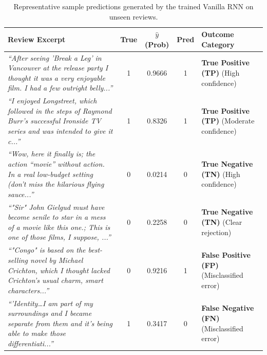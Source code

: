 \documentclass[11pt,a4paper]{article}
\begin{document}
\begin{table}[H]
\centering
\small
\begin{tabular}{p{7.2cm}cccp{2.6cm}}
\toprule
\textbf{Review Excerpt} & \textbf{True} & \textbf{$\hat{y}$ (Prob)} & \textbf{Pred} & \textbf{Outcome Category} \\
\midrule
\textit{``After seeing 'Break a Leg' in Vancouver at the release party I thought it was a very enjoyable film. I had a few outright belly...''} & 1 & 0.9666 & 1 & \textbf{True Positive (TP)} (High confidence) \\
\midrule
\textit{``I enjoyed Longstreet, which followed in the steps of Raymond Burr's successful Ironside TV series and was intended to give it c...''} & 1 & 0.8326 & 1 & \textbf{True Positive (TP)} (Moderate confidence) \\
\midrule
\textit{``Wow, here it finally is; the action ``movie'' without action. In a real low-budget setting (don't miss the hilarious flying sauce...''} & 0 & 0.0214 & 0 & \textbf{True Negative (TN)} (High confidence) \\
\midrule
\textit{``"Sir" John Gielgud must have become senile to star in a mess of a movie like this one.; This is one of those films, I suppose, ...''} & 0 & 0.2258 & 0 & \textbf{True Negative (TN)} (Clear rejection) \\
\midrule
\textit{``"Congo" is based on the best-selling novel by Michael Crichton, which I thought lacked Crichton's usual charm, smart characters...''} & 0 & 0.9216 & 1 & \textbf{False Positive (FP)} (Misclassified error) \\
\midrule
\textit{``'Identity\dots I am part of my surroundings and I became separate from them and it's being able to make those differentiati...''} & 1 & 0.3417 & 0 & \textbf{False Negative (FN)} (Misclassified error) \\
\bottomrule
\end{tabular}
\caption{Representative sample predictions generated by the trained Vanilla RNN on unseen reviews.}
\label{tab:sample_preds}
\end{table}
\end{document}
